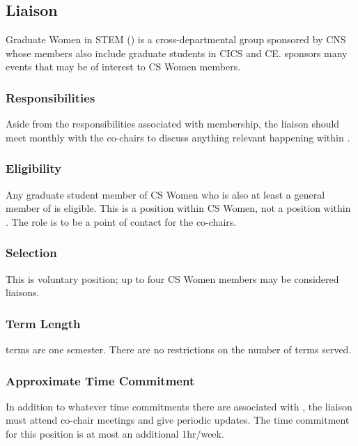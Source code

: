 \subsection{\gwis{} Liaison}
\label{sec:gwisliaison}
Graduate Women in STEM (\gwis) is a cross-departmental group sponsored by CNS whose members also include graduate students in CICS and CE. \gwis{} sponsors many events that may be of interest to CS Women members. 

\subsubsection{Responsibilities}
Aside from the responsibilities associated with \gwis{} membership, the \gwis{} liaison should meet monthly with the co-chairs to discuss anything relevant happening within \gwis{}.


\subsubsection{Eligibility}
Any graduate student member of CS Women who is also at least a general member of \gwis{} is eligible. This is a position within CS Women, not a position within \gwis{}. The role is to be a point of contact for the co-chairs. 

\subsubsection{Selection}
This is voluntary position; up to four CS Women members may be considered liaisons. 

\subsubsection{Term Length}
\gwis{} terms are one semester. There are no restrictions on the number of terms served.

\subsubsection{Approximate Time Commitment}
In addition to whatever time commitments there are associated with \gwis{}, the liaison must attend co-chair meetings and give periodic updates. The time commitment for this position is at most an additional 1hr/week.
